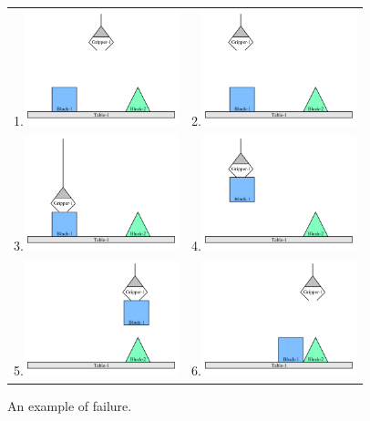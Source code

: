 \begin{figure}
\begin{tabular}{p{5cm}p{5cm}}
1.\includegraphics[width=4.5cm]{gfx/blocks_world_example-1} & 2.\includegraphics[width=4.5cm]{gfx/blocks_world_example-2} \\
3.\includegraphics[width=4.5cm]{gfx/blocks_world_example-3} & 4.\includegraphics[width=4.5cm]{gfx/blocks_world_example-4} \\
5.\includegraphics[width=4.5cm]{gfx/blocks_world_example-5} & 6.\includegraphics[width=4.5cm]{gfx/blocks_world_example-7}
\end{tabular}
\caption{An example of failure.}
\label{figure:blocks_world_example_of_failure}
\end{figure}

